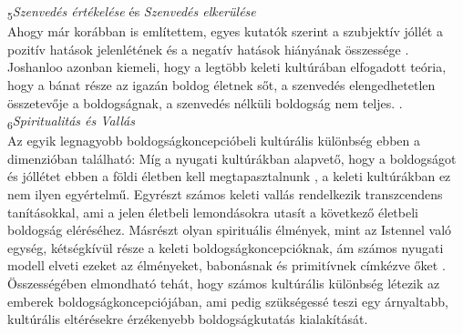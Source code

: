 \textsubscript{5}\textit{Szenvedés értékelése} és \textit{Szenvedés elkerülése}\\
Ahogy már korábban is említettem, egyes kutatók szerint a szubjektív jóllét a pozitív hatások jelenlétének és a negatív hatások hiányának összessége \cite{diener_suh_lucas_smith_1999}. Joshanloo azonban kiemeli, hogy a legtöbb keleti kultúrában elfogadott teória, hogy a bánat része az igazán boldog életnek sőt, a szenvedés elengedhetetlen összetevője a boldogságnak, a szenvedés nélküli boldogság nem teljes. \cite{joshanloo_2013_eastern}.\\
\textsubscript{6}\textit{Spiritualitás és Vallás}\\
Az egyik legnagyobb boldogságkoncepcióbeli kultúrális különbség ebben a dimenzi\-óban található: Míg a nyugati kultúrákban alapvető, hogy a boldogságot és jóllétet ebben a földi életben kell megtapasztalnunk \cite{joshanloo_2013_eastern}, a keleti kultúrákban ez nem ilyen egyértelmű. Egyrészt számos keleti vallás rendelkezik transzcendens tanításokkal, ami a jelen életbeli lemondásokra utasít a következő életbeli boldogság eléréséhez. Másrészt olyan spirituális élmények, mint az Istennel való egység, kétség\-kívül része a keleti boldogságkoncepcióknak, ám számos nyugati modell elveti ezeket az élményeket, babonásnak és primitívnek címkézve őket \cite{joshanloo_2013_eastern}.\\
Összességében elmondható tehát, hogy számos kultúrális különbség létezik az emberek boldogságkoncepciójában, ami pedig szükségessé teszi egy árnyaltabb, kultúrális eltérésekre érzékenyebb boldogságkutatás kialakítását.

